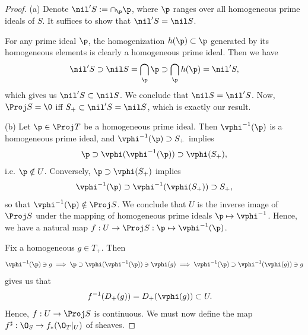 \documentclass[12pt]{amsart}
\begin{document}
\begin{proof}
  (a) Denote $\nil' S := \cap_\p\p$, where $\p$ ranges over all homogeneous prime ideals of $S$.
  It suffices to show that $\nil' S=\nil S$.


  For any prime ideal $\p$, the homogenization $h(\p)\subset \p$ generated by its homogeneous elements is clearly a homogeneous prime ideal.
  Then we have
  \[
    \nil' S \supset \nil S=\bigcap_{\p}\p \supset \bigcap_{\p}h(\p)=\nil' S,
  \] 
  which gives us $\nil'S\subset \nil S$.
  We conclude that $\nil S=\nil' S$.
  Now, $\Proj S=\0$ iff $S_+\subset \nil' S=\nil S$, which is exactly our result.

  (b) Let $\p\in \Proj T$ be a homogeneous prime ideal.
  Then $\vphi^{-1}(\p)$ is a homogeneous prime ideal, and $\vphi^{-1}(\p)\supset S_+$ implies 
  \[
    \p\supset \vphi(\vphi^{-1}(\p))\supset \vphi (S_+),
  \]
  i.e. $\p\notin U$.
  Conversely, $\p\supset \vphi(S_+)$ implies 
  \[
    \vphi^{-1}(\p)\supset \vphi^{-1}(\vphi(S_+))\supset S_+,
  \]
  so that $\vphi^{-1}(\p)\notin \Proj S$.
  We conclude that $U$ is the inverse image of $\Proj S$ under the mapping of homogeneous prime ideals $\p\mapsto \vphi^{-1}$.
  Hence, we have a natural map $f:U\to\Proj S:\p\mapsto \vphi^{-1}(\p)$.

  Fix a homogeneous $g\in T_+$.
  Then
  \begin{align*}
    \vphi^{-1}(\p)\ni g\implies \p\supset \vphi(\vphi^{-1}(\p))\ni \vphi(g) \implies \vphi^{-1}(\p)\supset \vphi^{-1}(\vphi(g))\ni g
  \end{align*}
  gives us that
  \begin{align*}
    f^{-1}(D_+(g)) &= D_+(\vphi(g))\subset U.
  \end{align*}
  Hence, $f:U\to \Proj S$ is continuous.
  We must now define the map $f^\sharp:\O_S\to f_*(\O_T|_U)$ of sheaves.


\end{proof}
\end{document}
